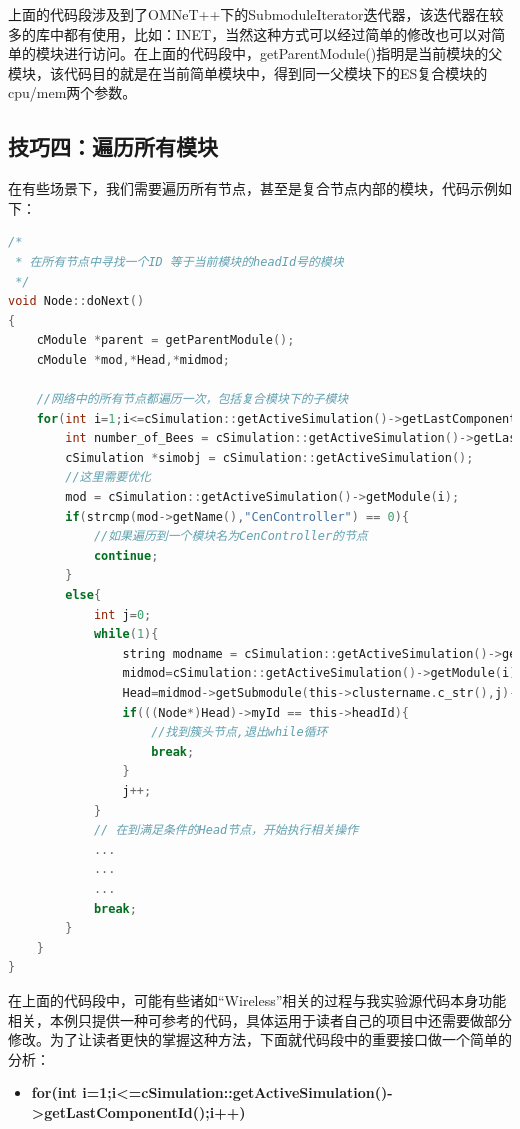 上面的代码段涉及到了OMNeT++下的SubmoduleIterator迭代器，该迭代器在较多的库中都有使用，比如：INET，当然这种方式可以经过简单的修改也可以对简单的模块进行访问。在上面的代码段中，getParentModule()指明是当前模块的父模块，该代码目的就是在当前简单模块中，得到同一父模块下的ES复合模块的cpu\slash mem两个参数。

\subsection{技巧四：遍历所有模块}
\label{技巧四：遍历所有模块}

在有些场景下，我们需要遍历所有节点，甚至是复合节点内部的模块，代码示例如下：

\begin{lstlisting}[language=c]
/*
 * 在所有节点中寻找一个ID 等于当前模块的headId号的模块
 */
void Node::doNext()
{
    cModule *parent = getParentModule();
    cModule *mod,*Head,*midmod;

    //网络中的所有节点都遍历一次，包括复合模块下的子模块
    for(int i=1;i<=cSimulation::getActiveSimulation()->getLastComponentId();i++){
        int number_of_Bees = cSimulation::getActiveSimulation()->getLastComponentId();
        cSimulation *simobj = cSimulation::getActiveSimulation();
        //这里需要优化
        mod = cSimulation::getActiveSimulation()->getModule(i);
        if(strcmp(mod->getName(),"CenController") == 0){
            //如果遍历到一个模块名为CenController的节点
            continue;
        }
        else{
            int j=0;
            while(1){
                string modname = cSimulation::getActiveSimulation()->getModule(i)->getName();
                midmod=cSimulation::getActiveSimulation()->getModule(i);
                Head=midmod->getSubmodule(this->clustername.c_str(),j)->getSubmodule("Wireless");
                if(((Node*)Head)->myId == this->headId){
                    //找到簇头节点,退出while循环
                    break;
                }
                j++;
            }
            // 在到满足条件的Head节点，开始执行相关操作
            ...
            ...
            ...
            break;
        }
    }
}

\end{lstlisting}

在上面的代码段中，可能有些诸如“Wireless”相关的过程与我实验源代码本身功能相关，本例只提供一种可参考的代码，具体运用于读者自己的项目中还需要做部分修改。为了让读者更快的掌握这种方法，下面就代码段中的重要接口做一个简单的分析：

\begin{itemize}
\item \textbf{for(int i=1;i<=cSimulation::getActiveSimulation()->getLastComponentId();i++)}

\end{itemize}

